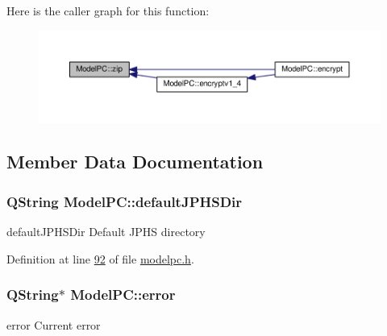 Here is the caller graph for this function\+:
\nopagebreak
\begin{figure}[H]
\begin{center}
\leavevmode
\includegraphics[width=350pt]{class_model_p_c_afebbbfa4b07deba4f68fc6dfb50f353f_icgraph}
\end{center}
\end{figure}




\subsection{Member Data Documentation}
\subsubsection[{\texorpdfstring{default\+J\+P\+H\+S\+Dir}{defaultJPHSDir}}]{\setlength{\rightskip}{0pt plus 5cm}Q\+String Model\+P\+C\+::default\+J\+P\+H\+S\+Dir}\hypertarget{class_model_p_c_abd038306f14f22fb885a1697c96d6335}{}\label{class_model_p_c_abd038306f14f22fb885a1697c96d6335}


default\+J\+P\+H\+S\+Dir Default J\+P\+HS directory 



Definition at line \hyperlink{modelpc_8h_source_l00092}{92} of file \hyperlink{modelpc_8h_source}{modelpc.\+h}.

\subsubsection[{\texorpdfstring{error}{error}}]{\setlength{\rightskip}{0pt plus 5cm}Q\+String$\ast$ Model\+P\+C\+::error\hspace{0.3cm}{\ttfamily [protected]}}\hypertarget{class_model_p_c_a4e5a9c0ca1f06fe5bc478b6bf248c37c}{}\label{class_model_p_c_a4e5a9c0ca1f06fe5bc478b6bf248c37c}


error Current error 



